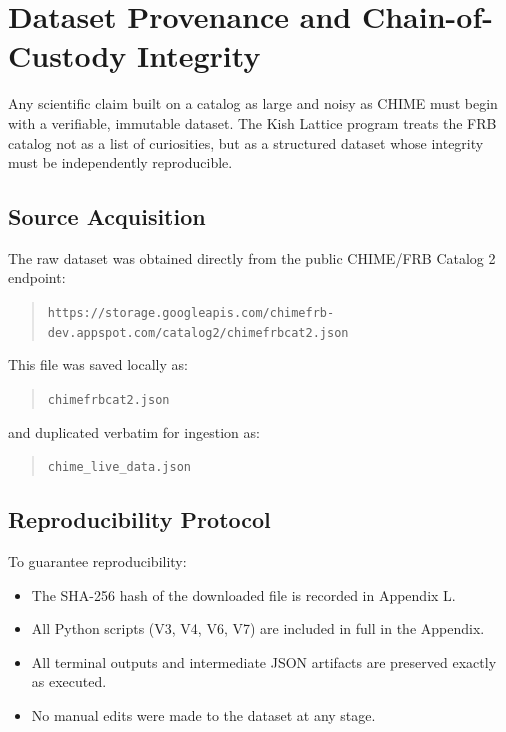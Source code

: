 \documentclass[11pt, letterpaper, openany]{book}
\begin{document}
\section{Dataset Provenance and Chain-of-Custody Integrity}

Any scientific claim built on a catalog as large and noisy as CHIME must begin with a verifiable,
immutable dataset. The Kish Lattice program treats the FRB catalog not as a list of curiosities,
but as a structured dataset whose integrity must be independently reproducible.

\subsection*{Source Acquisition}

The raw dataset was obtained directly from the public CHIME/FRB Catalog 2 endpoint:

\begin{quote}
\texttt{https://storage.googleapis.com/chimefrb-dev.appspot.com/catalog2/chimefrbcat2.json}
\end{quote}

This file was saved locally as:

\begin{quote}
\texttt{chimefrbcat2.json}
\end{quote}

and duplicated verbatim for ingestion as:

\begin{quote}
\texttt{chime\_live\_data.json}
\end{quote}

\subsection*{Reproducibility Protocol}

To guarantee reproducibility:

\begin{itemize}
    \item The SHA-256 hash of the downloaded file is recorded in Appendix L.
    \item All Python scripts (V3, V4, V6, V7) are included in full in the Appendix.
    \item All terminal outputs and intermediate JSON artifacts are preserved exactly as executed.
    \item No manual edits were made to the dataset at any stage.
\end{itemize}
\end{document}

